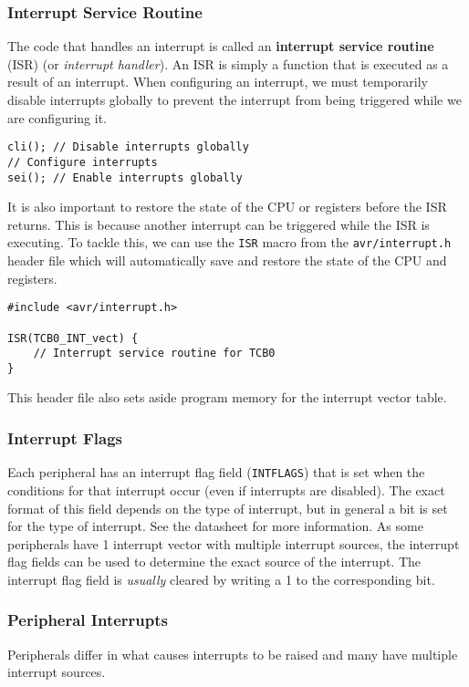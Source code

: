 \documentclass{article}
\begin{document}
\subsubsection{Interrupt Service Routine}
The code that handles an interrupt is called an \textbf{interrupt
service routine} (ISR) (or \textit{interrupt handler}). An ISR is
simply a function that is executed as a result of an interrupt. When
configuring an interrupt, we must temporarily disable interrupts
globally to prevent the interrupt from being triggered while we are
configuring it.
\begin{verbatim}
cli(); // Disable interrupts globally
// Configure interrupts
sei(); // Enable interrupts globally
\end{verbatim}
It is also important to restore the state of the CPU or registers
before the ISR returns. This is because another interrupt can be
triggered while the ISR is executing. To tackle this, we can use the
\texttt{ISR} macro from the \texttt{avr/interrupt.h}
header file which will automatically save and restore the state of the
CPU and registers.
\begin{verbatim}
#include <avr/interrupt.h>

ISR(TCB0_INT_vect) {
    // Interrupt service routine for TCB0
}
\end{verbatim}
This header file also sets aside program memory for the interrupt
vector table.
\subsubsection{Interrupt Flags}
Each peripheral has an interrupt flag field (\texttt{INTFLAGS})
that is set when the conditions for that interrupt occur (even if
interrupts are disabled). The exact format of this field depends on the
type of interrupt, but in general a bit is set for the type of
interrupt. See the datasheet for more information. As some peripherals
have 1 interrupt vector with multiple interrupt sources, the interrupt
flag fields can be used to determine the exact source of the interrupt.
The interrupt flag field is \textit{usually} cleared by writing a 1 to
the corresponding bit.
\subsubsection{Peripheral Interrupts}
Peripherals differ in what causes interrupts to be raised and many have
multiple interrupt sources.
\end{document}
